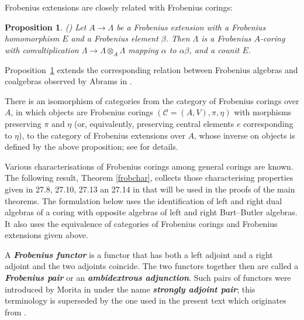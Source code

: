 \documentclass[12pt,a4paper]{amsart}
\theoremstyle{plain}
\newtheorem{prop}[thm]{Proposition}
\theoremstyle{definition}
\numberwithin{equation}{thm}
\newcommand{\emphbf}[1]{\emph{\textbf{#1}}}
\begin{document}
Frobenius extensions are closely related with Frobenius corings:

\begin{prop}(\cite[27.6]{BW03}) \label{prop.Fro}
  Let $A \rightarrow \Lambda$ be a Frobenius extension with a Frobenius
  homomorphism $E$ and a Frobenius element $\beta$. Then $\Lambda$  is a
  Frobenius $A$-coring with comultiplication 
  $\Lambda \rightarrow \Lambda \otimes_A
  \Lambda$ mapping $\alpha$ to $\alpha \beta$, and a counit $E$.
\end{prop}

 Proposition~\ref{prop.Fro} extends the corresponding relation between Frobenius algebras and coalgebras observed by Abrams in \cite{Abr96,Abr99}.



There is an isomorphism of categories from the category of
Frobenius corings  over $A$, in which objects are Frobenius corings $(\mathcal{C}=(A,V),\pi,\eta)$ with morphisms preserving $\pi$ and $\eta$ (or, equivalently, preserving central elements $e$ corresponding to $\eta$), to the category of Frobenius extensions
over $A$, whose inverse on objects is defined by the above proposition;
see \cite[27.16]{BW03} for details.


Various characterisations of Frobenius corings among general corings are
known. The following result, Theorem \ref{frobchar}, collects those characterising properties given
in 27.8, 27.10, 27.13 an 27.14 in \cite{BW03} that will be used in the
proofs of the main theorems.
The formulation below uses the identification of left and right dual algebras
of a coring with opposite algebras of left and right Burt--Butler algebras. It also uses the equivalence of
categories of Frobenius corings and Frobenius extensions given above.

A \emphbf{Frobenius functor} is a functor that has both a left adjoint and a
right adjoint and the two adjoints coincide. The two functors together
then are called a \emphbf{Frobenius pair} or an \emphbf{ambidextrous adjunction}. Such pairs of functors were introduced by Morita in \cite{Mor65} under the name \emphbf{strongly adjoint pair}; this terminology is superseded by the one used in the present text which originates from \cite{CMZ97}. 
\end{document}
